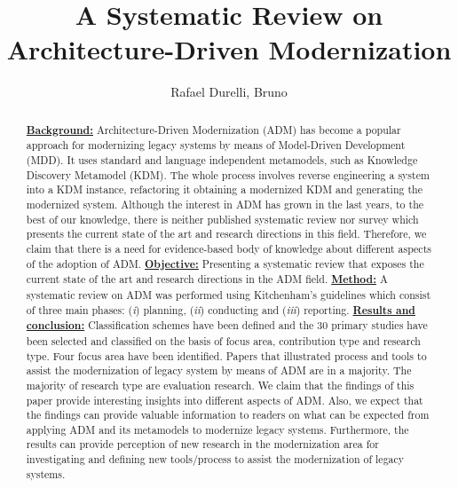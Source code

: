 \documentclass{llncs}
\begin{document}
\title{A Systematic Review on Architecture-Driven Modernization}

\author{Rafael Durelli, Bruno}

\maketitle

\begin{abstract}

\underline{\textbf{Background:}} Architecture-Driven Modernization (ADM) has become a popular approach for modernizing legacy systems by means of Model-Driven Development (MDD). It uses standard and language independent metamodels, such as Knowledge Discovery Metamodel (KDM). The whole process involves reverse engineering a system into a KDM instance, refactoring it obtaining a modernized KDM and generating the modernized system. Although the interest in ADM has grown in the last years, to the best of our knowledge, there is neither published systematic review nor survey which presents the current state of the art and research directions in this field. Therefore, we claim that there is a need for evidence-based body of knowledge about different aspects of the adoption of ADM. \underline{\textbf{Objective:}} Presenting a systematic review that exposes the current state of the art and research directions in the ADM field. \underline{\textbf{Method:}} A systematic review on ADM was performed using Kitchenham's guidelines which consist of three main phases: (\textit{i}) planning, (\textit{ii}) conducting and (\textit{iii}) reporting. \underline{\textbf{Results and conclusion:}} Classification schemes have been defined and the 30 primary studies have been selected and classified on the basis of focus area, contribution type and research type. Four focus area have been identified. Papers that illustrated process and tools to assist the modernization of legacy system by means of ADM are in a majority. The majority of research type are evaluation research. We claim that the findings of this paper provide interesting insights into different aspects of ADM. Also, we expect that the findings can provide valuable information to readers on what can be expected from applying ADM and its metamodels to modernize legacy systems. Furthermore, the results can provide perception of new research in the modernization area for investigating and defining new tools/process to assist the modernization of legacy systems.

\end{abstract}
\end{document}
